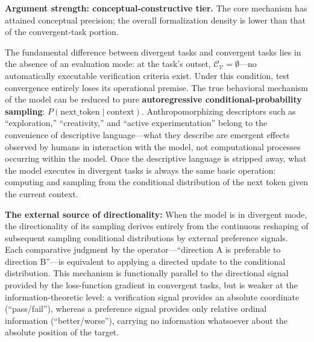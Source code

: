 \documentclass[11pt,a4paper]{article}
\theoremstyle{definition}
\newcommand{\verifspace}{\mathcal{C}_{\mathcal{V}}}
\begin{document}
\textbf{Argument strength: conceptual-constructive tier.} The core mechanism has attained conceptual precision; the overall formalization density is lower than that of the convergent-task portion.

The fundamental difference between divergent tasks and convergent tasks lies in the absence of an evaluation mode: at the task's outset, $\verifspace = \emptyset$---no automatically executable verification criteria exist. Under this condition, test convergence entirely loses its operational premise. The true behavioral mechanism of the model can be reduced to pure \textbf{autoregressive conditional-probability sampling}: $P(\text{next\_token} \mid \text{context})$. Anthropomorphizing descriptors such as ``exploration,'' ``creativity,'' and ``active experimentation'' belong to the convenience of descriptive language---what they describe are emergent effects observed by humans in interaction with the model, not computational processes occurring within the model. Once the descriptive language is stripped away, what the model executes in divergent tasks is always the same basic operation: computing and sampling from the conditional distribution of the next token given the current context.

\textbf{The external source of directionality:} When the model is in divergent mode, the directionality of its sampling derives entirely from the continuous reshaping of subsequent sampling conditional distributions by external preference signals. Each comparative judgment by the operator---``direction A is preferable to direction B''---is equivalent to applying a directed update to the conditional distribution. This mechanism is functionally parallel to the directional signal provided by the loss-function gradient in convergent tasks, but is weaker at the information-theoretic level: a verification signal provides an absolute coordinate (``pass/fail''), whereas a preference signal provides only relative ordinal information (``better/worse''), carrying no information whatsoever about the absolute position of the target.
\end{document}
